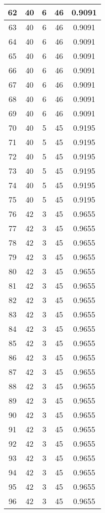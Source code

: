 \documentclass[letterpaper, 12pt]{article}
\begin{document}
\begin{longtable}{|c|c|c|c|c|}
\hline
62 & 40 & 6 & 46 & 0.9091 \\
\hline
63 & 40 & 6 & 46 & 0.9091 \\
\hline
64 & 40 & 6 & 46 & 0.9091 \\
\hline
65 & 40 & 6 & 46 & 0.9091 \\
\hline
66 & 40 & 6 & 46 & 0.9091 \\
\hline
67 & 40 & 6 & 46 & 0.9091 \\
\hline
68 & 40 & 6 & 46 & 0.9091 \\
\hline
69 & 40 & 6 & 46 & 0.9091 \\
\hline
70 & 40 & 5 & 45 & 0.9195 \\
\hline
71 & 40 & 5 & 45 & 0.9195 \\
\hline
72 & 40 & 5 & 45 & 0.9195 \\
\hline
73 & 40 & 5 & 45 & 0.9195 \\
\hline
74 & 40 & 5 & 45 & 0.9195 \\
\hline
75 & 40 & 5 & 45 & 0.9195 \\
\hline
76 & 42 & 3 & 45 & 0.9655 \\
\hline
77 & 42 & 3 & 45 & 0.9655 \\
\hline
78 & 42 & 3 & 45 & 0.9655 \\
\hline
79 & 42 & 3 & 45 & 0.9655 \\
\hline
80 & 42 & 3 & 45 & 0.9655 \\
\hline
81 & 42 & 3 & 45 & 0.9655 \\
\hline
82 & 42 & 3 & 45 & 0.9655 \\
\hline
83 & 42 & 3 & 45 & 0.9655 \\
\hline
84 & 42 & 3 & 45 & 0.9655 \\
\hline
85 & 42 & 3 & 45 & 0.9655 \\
\hline
86 & 42 & 3 & 45 & 0.9655 \\
\hline
87 & 42 & 3 & 45 & 0.9655 \\
\hline
88 & 42 & 3 & 45 & 0.9655 \\
\hline
89 & 42 & 3 & 45 & 0.9655 \\
\hline
90 & 42 & 3 & 45 & 0.9655 \\
\hline
91 & 42 & 3 & 45 & 0.9655 \\
\hline
92 & 42 & 3 & 45 & 0.9655 \\
\hline
93 & 42 & 3 & 45 & 0.9655 \\
\hline
94 & 42 & 3 & 45 & 0.9655 \\
\hline
95 & 42 & 3 & 45 & 0.9655 \\
\hline
96 & 42 & 3 & 45 & 0.9655 \\

\end{longtable}
\end{document}
